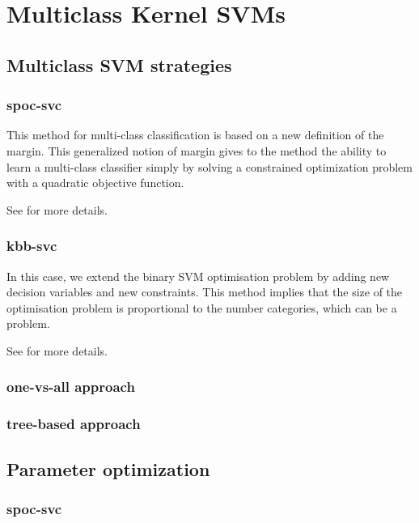 
\section{Multiclass Kernel SVMs}


\subsection{Multiclass SVM strategies}

\subsubsection{spoc-svc}

This method for multi-class classification is based on a new definition of the margin. This generalized notion of margin gives to the method the ability to learn a multi-class classifier simply by solving a constrained optimization
problem with a quadratic objective function.

See \cite{spoc-svc} for more details.


\subsubsection{kbb-svc}

In this case, we extend the binary SVM optimisation problem by adding new decision variables and new constraints. This method implies that the size of the optimisation problem is proportional to the number categories, which can be a problem. 

See \cite{kbb-svc} for more details.


\subsubsection{one-vs-all approach}


\subsubsection{tree-based approach}



\subsection{Parameter optimization}

\subsubsection{spoc-svc}

